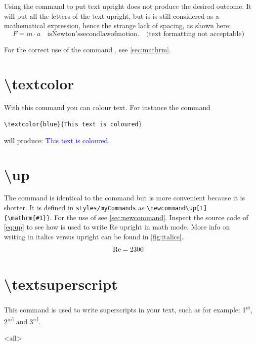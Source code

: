 Using the command  to put text upright does not produce the desired outcome. It will put all the letters of the text upright, but is is still considered as a mathematical expression, hence the strange lack of spacing, as shown here:
\begin{equation*}
    F=m\cdot a \quad \mathrm{is Newton's second law of motion.}\quad\text{(text formatting not acceptable)}
\end{equation*}

For the correct use of the command , see \cref{sec:mathrm}.

\section{\textbackslash textcolor}
With this command you can colour text. For instance the command

\verb|\textcolor{blue}{This text is coloured}|

will produce: \textcolor{blue}{This text is coloured}.

\section{\textbackslash up}\label{sec:up}
The command  is identical to the command  but is more convenient because it is shorter. It is defined in \verb|styles/myCommands| as \verb|\newcommand\up[1]{\mathrm{#1}}|. For the use of  see \cref{sec:newcommand}. Inspect the source code of \cref{eq:up} to see how  is used to write Re upright in math mode. More info on writing in italics versus upright can be found in \cref{fig:italics}.
\begin{equation}\label{eq:up}
    \up{Re}=2300
\end{equation}

\section{\textbackslash textsuperscript}
This command is used to write superscripts in your text, such as for example: 1\textsuperscript{st}, 2\textsuperscript{nd} and 3\textsuperscript{rd}.


\mode<all>